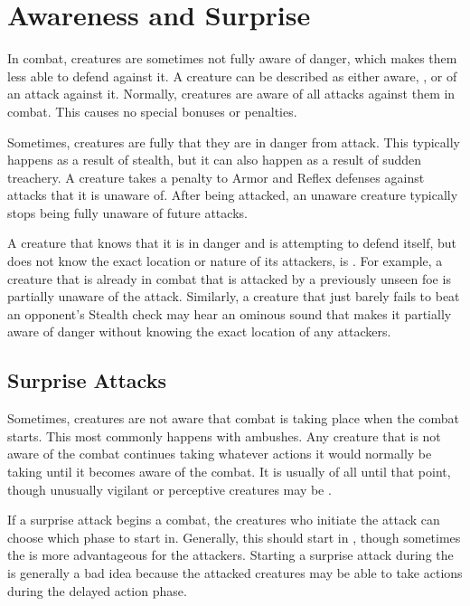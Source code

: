 \section{Awareness and Surprise}\label{Awareness and Surprise}
    In combat, creatures are sometimes not fully aware of danger, which makes them less able to defend against it.
    A creature can be described as either aware, \unaware, or \partiallyunaware of an attack against it.
    Normally, creatures are aware of all attacks against them in combat.
    This causes no special bonuses or penalties.

    Sometimes, creatures are fully \unaware that they are in danger from attack.
    This typically happens as a result of stealth, but it can also happen as a result of sudden treachery.
    A creature takes a  penalty to Armor and Reflex defenses against attacks that it is unaware of.
    After being attacked, an unaware creature typically stops being fully unaware of future attacks.

    A creature that knows that it is in danger and is attempting to defend itself, but does not know the exact location or nature of its attackers, is \partiallyunaware.
    For example, a creature that is already in combat that is attacked by a previously unseen foe is partially unaware of the attack.
    Similarly, a creature that just barely fails to beat an opponent's Stealth check may hear an ominous sound that makes it partially aware of danger without knowing the exact location of any attackers.

    \subsection{Surprise Attacks}\label{Surprise Attacks}
        Sometimes, creatures are not aware that combat is taking place when the combat starts.
        This most commonly happens with ambushes.
        Any creature that is not aware of the combat continues taking whatever actions it would normally be taking until it becomes aware of the combat.
        It is usually \unaware of all until that point, though unusually vigilant or perceptive creatures may be \partiallyunaware.

        If a surprise attack begins a combat, the creatures who initiate the attack can choose which phase to start in.
        Generally, this should start in , though sometimes the  is more advantageous for the attackers.
        Starting a surprise attack during the  is generally a bad idea because the attacked creatures may be able to take actions during the delayed action phase.

